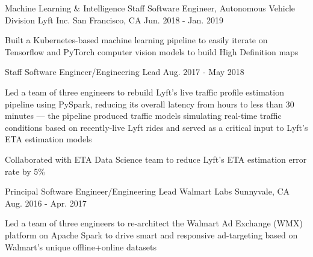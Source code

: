 \begin{cventries}
  \cventry
  {Machine Learning \& Intelligence Staff Software Engineer, Autonomous Vehicle Division} %
  {Lyft Inc.} %
  {San Francisco, CA} %
  {Jun. 2018 - Jan. 2019} %
  {
    \begin{cvitems} %
      \item{Built a Kubernetes-based machine learning pipeline to easily iterate on Tensorflow and PyTorch computer vision models to build High Definition maps}
    \end{cvitems}
  }

  \cventry
  {Staff Software Engineer/Engineering Lead} %
  {} %
  {} %
  {Aug. 2017 - May 2018} %
  {
    \begin{cvitems} %
      \item{Led a team of three engineers to rebuild Lyft's live traffic profile estimation pipeline using PySpark, reducing its overall latency from hours to less than 30 minutes --- the pipeline produced traffic models simulating real-time traffic conditions based on recently-live Lyft rides and served as a critical input to Lyft's ETA estimation models}
      \item{Collaborated with ETA Data Science team to reduce Lyft's ETA estimation error rate by 5\%}
    \end{cvitems}
  }

  \cventry
  {Principal Software Engineer/Engineering Lead} %
  {Walmart Labs} %
  {Sunnyvale, CA} %
  {Aug. 2016 - Apr. 2017} %
  {
    \begin{cvitems} %
      \item{Led a team of three engineers to re-architect the Walmart Ad Exchange (WMX) platform on Apache Spark to drive smart and responsive ad-targeting based on Walmart’s unique offline+online datasets}
    \end{cvitems}
  }


\end{cventries}
